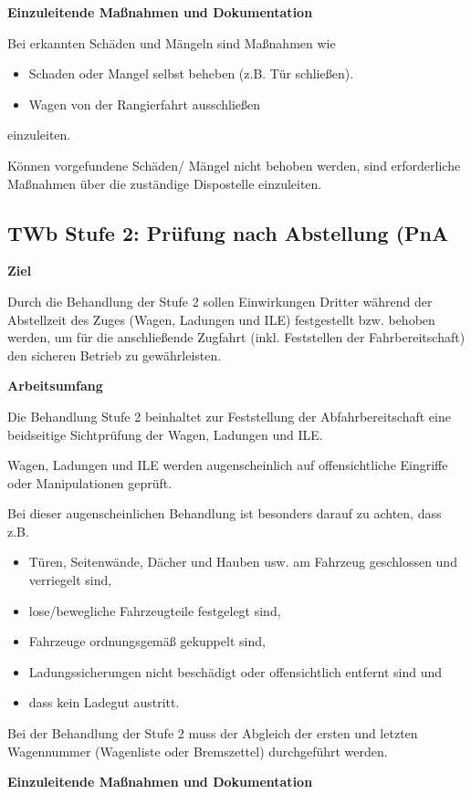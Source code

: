 \textbf{Einzuleitende Maßnahmen und Dokumentation}\par
Bei erkannten Schäden und Mängeln sind Maßnahmen wie
\begin{itemize}
    \item Schaden oder Mangel selbst beheben (z.B. Tür schließen).
    \item Wagen von der Rangierfahrt ausschließen
\end{itemize}
einzuleiten.\par
Können vorgefundene Schäden/ Mängel nicht behoben
werden, sind erforderliche Maßnahmen über die zuständige
Dispostelle einzuleiten.
\subsection{TWb Stufe 2: Prüfung nach Abstellung (PnA}
\textbf{Ziel}\par
Durch die Behandlung der Stufe 2 sollen Einwirkungen Dritter während der Abstellzeit des Zuges (Wagen, Ladungen und ILE) festgestellt bzw. behoben werden, um für die anschließende Zugfahrt (inkl. Feststellen der Fahrbereitschaft) den sicheren Betrieb zu gewährleisten.\par
\textbf{Arbeitsumfang}\par
Die Behandlung Stufe 2 beinhaltet zur Feststellung der
Abfahrbereitschaft eine beidseitige Sichtprüfung der Wagen,
Ladungen und ILE. \par
Wagen, Ladungen und ILE werden augenscheinlich auf offensichtliche
Eingriffe oder Manipulationen geprüft.\par
Bei dieser augenscheinlichen Behandlung ist besonders
darauf zu achten, dass z.B.
\begin{itemize}
    \item Türen, Seitenwände, Dächer und Hauben usw. am Fahrzeug geschlossen und verriegelt sind,
    \item lose/bewegliche Fahrzeugteile festgelegt sind,
    \item Fahrzeuge ordnungsgemäß gekuppelt sind,
    \item Ladungssicherungen nicht beschädigt oder offensichtlich entfernt sind und
    \item dass kein Ladegut austritt.
\end{itemize}
Bei der Behandlung der Stufe 2 muss der Abgleich der ersten und letzten Wagennummer (Wagenliste oder Bremszettel) durchgeführt werden.\par
\textbf{Einzuleitende Maßnahmen und Dokumentation}\par
